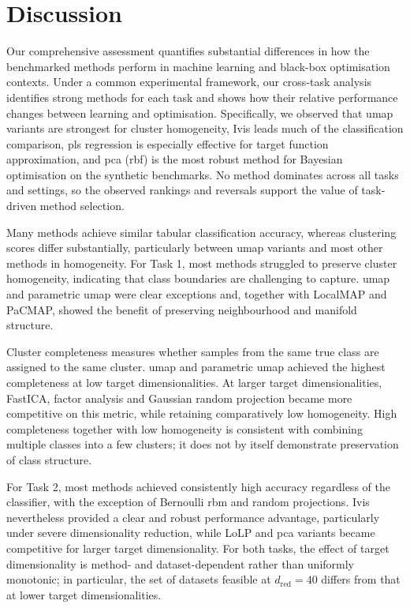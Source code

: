 \FloatBarrier
\section{Discussion}
\label{sec:ch05:disc}

Our comprehensive assessment quantifies substantial differences in how the benchmarked methods perform in machine learning and black-box optimisation contexts.
Under a common experimental framework, our cross-task analysis identifies strong methods for each task and shows how their relative performance changes between learning and optimisation.
Specifically, we observed that \gls{umap} variants are strongest for cluster homogeneity, Ivis leads much of the classification comparison, \gls{pls} regression is especially effective for target function approximation, and \gls{pca} (\gls{rbf}) is the most robust method for Bayesian optimisation on the synthetic benchmarks.
No method dominates across all tasks and settings, so the observed rankings and reversals support
the value of task-driven method selection.

Many methods achieve similar tabular classification accuracy, whereas clustering scores differ substantially, particularly between \gls{umap} variants and most other methods in homogeneity.
For Task 1, most methods struggled to preserve cluster homogeneity, indicating that class boundaries are challenging to capture. \gls{umap} and parametric \gls{umap} were clear exceptions and, together with LocalMAP and PaCMAP, showed the benefit of preserving neighbourhood and manifold structure.

Cluster completeness measures whether samples from the same true class are assigned to the same cluster. \gls{umap} and parametric \gls{umap} achieved the highest completeness at low target dimensionalities. At larger target dimensionalities, FastICA, factor analysis and Gaussian random projection became more competitive on this metric, while retaining comparatively low homogeneity. High completeness together with low homogeneity is consistent with combining multiple classes into a few clusters; it does not by itself demonstrate preservation of class structure.

For Task 2, most methods achieved consistently high accuracy regardless of the classifier, with the exception of Bernoulli \gls{rbm} and random projections. Ivis nevertheless provided a clear and robust performance advantage, particularly under severe dimensionality reduction, while LoLP and \gls{pca} variants became competitive for larger target dimensionality.
For both tasks, the effect of target dimensionality is method- and dataset-dependent rather than uniformly monotonic; in particular, the set of datasets feasible at $d_{\mathrm{red}}=40$ differs from that at lower target dimensionalities.

